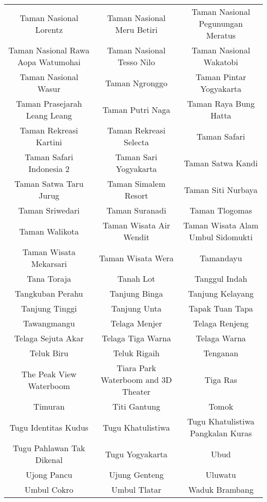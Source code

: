 \begin{table}[H]
\begin{tabular}{ c | c | c}
Taman Nasional Lorentz & Taman Nasional Meru Betiri & Taman Nasional Pegunungan Meratus\\
Taman Nasional Rawa Aopa Watumohai & Taman Nasional Tesso Nilo & Taman Nasional Wakatobi\\
Taman Nasional Wasur & Taman Ngronggo & Taman Pintar Yogyakarta\\
Taman Prasejarah Leang Leang & Taman Putri Naga & Taman Raya Bung Hatta\\
Taman Rekreasi Kartini & Taman Rekreasi Selecta & Taman Safari\\
Taman Safari Indonesia 2 & Taman Sari Yogyakarta & Taman Satwa Kandi\\
Taman Satwa Taru Jurug & Taman Simalem Resort & Taman Siti Nurbaya\\
Taman Sriwedari & Taman Suranadi & Taman Tlogomas\\
Taman Walikota & Taman Wisata Air Wendit & Taman Wisata Alam Umbul Sidomukti\\
Taman Wisata Mekarsari & Taman Wisata Wera & Tamandayu\\
Tana Toraja & Tanah Lot & Tanggul Indah\\
Tangkuban Perahu & Tanjung Binga & Tanjung Kelayang\\
Tanjung Tinggi & Tanjung Unta & Tapak Tuan Tapa\\
Tawangmangu & Telaga Menjer & Telaga Renjeng\\
Telaga Sejuta Akar & Telaga Tiga Warna & Telaga Warna\\
Teluk Biru & Teluk Rigaih & Tenganan\\
The Peak View Waterboom & Tiara Park Waterboom and 3D Theater & Tiga Ras\\
Timuran & Titi Gantung & Tomok\\
Tugu Identitas Kudus & Tugu Khatulistiwa & Tugu Khatulistiwa Pangkalan Kuras\\
Tugu Pahlawan Tak Dikenal & Tugu Yogyakarta & Ubud\\
Ujong Pancu & Ujung Genteng & Uluwatu\\
Umbul Cokro & Umbul Tlatar & Waduk Brambang\\
	\end{tabular}	
\end{table}	
